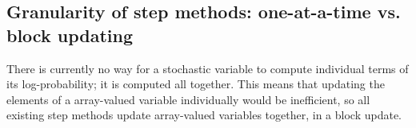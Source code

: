 %
%
%
%

\subsection{Granularity of step methods: one-at-a-time vs. block updating}
\label{subsec:granularity}
There is currently no way for a stochastic variable to compute individual terms of its log-probability; it is computed all together. This means that updating the elements of a array-valued variable individually would be inefficient, so all existing step methods update array-valued variables together, in a block update.

